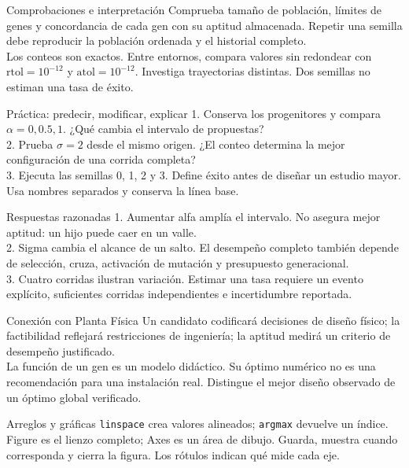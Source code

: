 \begin{frame}[fragile]{Comprobaciones e interpretación}
Comprueba tamaño de población, límites de genes y concordancia de cada gen con su aptitud almacenada. Repetir una semilla debe reproducir la población ordenada y el historial completo.\\[0.7em]
Los conteos son exactos. Entre entornos, compara valores sin redondear con $\mathrm{rtol}=10^{-12}$ y $\mathrm{atol}=10^{-12}$. Investiga trayectorias distintas. Dos semillas no estiman una tasa de éxito.
\end{frame}

\begin{frame}[fragile]{Práctica: predecir, modificar, explicar}
1. Conserva los progenitores y compara $\alpha=0,0.5,1$. ¿Qué cambia el intervalo de propuestas?\\[0.6em]
2. Prueba $\sigma=2$ desde el mismo origen. ¿El conteo determina la mejor configuración de una corrida completa?\\[0.6em]
3. Ejecuta las semillas 0, 1, 2 y 3. Define éxito antes de diseñar un estudio mayor. Usa nombres separados y conserva la línea base.
\end{frame}

\begin{frame}[fragile]{Respuestas razonadas}
1. Aumentar alfa amplía el intervalo. No asegura mejor aptitud: un hijo puede caer en un valle.\\[0.6em]
2. Sigma cambia el alcance de un salto. El desempeño completo también depende de selección, cruza, activación de mutación y presupuesto generacional.\\[0.6em]
3. Cuatro corridas ilustran variación. Estimar una tasa requiere un evento explícito, suficientes corridas independientes e incertidumbre reportada.
\end{frame}

\begin{frame}[fragile]{Conexión con Planta Física}
Un candidato codificará decisiones de diseño físico; la factibilidad reflejará restricciones de ingeniería; la aptitud medirá un criterio de desempeño justificado.\\[0.7em]
La función de un gen es un modelo didáctico. Su óptimo numérico no es una recomendación para una instalación real. Distingue el mejor diseño observado de un óptimo global verificado.
\end{frame}

\begin{frame}[fragile]{Arreglos y gráficas}
\texttt{linspace} crea valores alineados; \texttt{argmax} devuelve un índice. Figure es el lienzo completo; Axes es un área de dibujo. Guarda, muestra cuando corresponda y cierra la figura. Los rótulos indican qué mide cada eje.
\end{frame}

